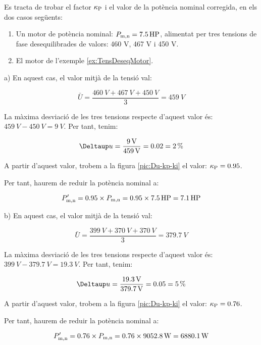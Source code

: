 \begin{exemple}[\MotorTensDeseqNEMA{}]
	\addcontentsxms{\MotorTensDeseqNEMA}
Es tracta de trobar el factor $\kappa_\mathrm{P}$  i el valor de la potència nominal corregida, en els dos casos següents:	
    \begin{enumerate}
		\renewcommand{\labelenumi}{\alph{enumi})}
		\item Un motor de  potència nominal: $P_\mathrm{m,n} = \qty{7,5}{HP}$, alimentat per tres tensions de fase desequilibrades   de valors: 460 V, 467 V i 450 V.
		
		\item El motor de l'exemple \vref{ex:TensDeseqMotor}.
	\end{enumerate}
	
	a)  En aquest cas, el valor mitjà de la tensió val:
	
    \[
      \bar{U} = \frac{\qty{460}{V}+\qty{467}{V}+\qty{450}{V}}{3} = \qty{459}{V}
    \]

    La màxima desviació de les tres tensions respecte d'aquest valor és: $\qty{459}{V}-\qty{450}{V} = \qty{9}{V}$. Per tant, tenim:
    
    \[
        \Deltaup u = \frac{\qty{9}{V}}{\qty{459}{V}} = \num{0,02} = \qty{2}{\%}
    \]

     A partir d'aquest valor, trobem a la figura \vref{pic:Du-kp-ki} el valor:  $\kappa_\mathrm{P} = \num{0,95}$.

     Per tant, haurem de reduir la potència nominal a:
     
     \[
         P'_\mathrm{m,n} = \num{0,95}\times{}P_\mathrm{m,n}  = \num{0,95}\times\qty{7,5}{HP} = \qty{7,1}{HP}
     \]
     
	 b)  En aquest cas, el valor mitjà de la tensió val:
	 
	 \[
	 \bar{U} = \frac{\qty{399}{V}+\qty{370}{V}+\qty{370}{V}}{3} = \qty{379,7}{V}
	 \]
	 
	 La màxima desviació de les tres tensions respecte d'aquest valor és: $\qty{399}{V}-\qty{379,7}{V} = \qty{19,3}{V}$. Per tant, tenim:
	 
	 \[
	 \Deltaup u = \frac{\qty{19,3}{V}}{\qty{379,7}{V}} = \num{0,05} = \qty{5}{\%}
	 \]
	 
	 A partir d'aquest valor, trobem a la figura \ref{pic:Du-kp-ki} el valor:  $\kappa_\mathrm{P} = \num{0,76}$.    
     
     Per tant, haurem de reduir la potència nominal a:
     
     \[
     P'_\mathrm{m,n} = \num{0,76}\times{}P_\mathrm{m,n}  = \num{0,76}\times\qty{9052,8}{W} = \qty{6880,1}{W}
     \]
\end{exemple}

